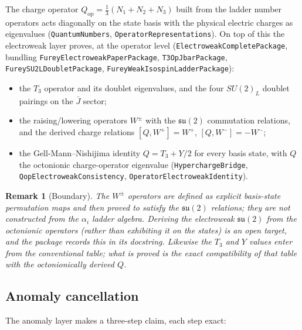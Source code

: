 \documentclass[11pt]{article}
\newcommand{\su}{\mathfrak{su}}
\newcommand{\leanname}[1]{\texttt{#1}}
\newtheorem{remark}{Remark}
\begin{document}
The charge operator $Q_{\mathrm{op}} = \tfrac13(N_1 + N_2 + N_3)$ built
from the ladder number operators acts diagonally on the state basis with
the physical electric charges as eigenvalues
(\leanname{QuantumNumbers}, \leanname{OperatorRepresentations}).  On top
of this the electroweak layer proves, at the operator level
(\leanname{ElectroweakCompletePackage}, bundling
\leanname{FureyElectroweakPaperPackage}, \leanname{T3OpJbarPackage},
\leanname{FureySU2LDoubletPackage},
\leanname{FureyWeakIsospinLadderPackage}):

\begin{itemize}[leftmargin=2em]
\item the $T_3$ operator and its doublet eigenvalues, and the four
  $SU(2)_L$ doublet pairings on the $\bar J$ sector;
\item the raising/lowering operators $W^\pm$ with the $\su(2)$
  commutation relations, and the derived charge relations
  $[Q, W^+] = W^+$, $[Q, W^-] = -W^-$;
\item the Gell-Mann--Nishijima identity $Q = T_3 + Y/2$ for every basis
  state, with $Q$ the octonionic charge-operator eigenvalue
  (\leanname{HyperchargeBridge}, \leanname{QopElectroweakConsistency},
  \leanname{OperatorElectroweakIdentity}).
\end{itemize}

\begin{remark}[Boundary]
The $W^\pm$ operators are \emph{defined} as explicit basis-state
permutation maps and then proved to satisfy the $\su(2)$ relations; they
are not constructed from the $\alpha_i$ ladder algebra.  Deriving the
electroweak $\su(2)$ from the octonionic operators (rather than
exhibiting it on the states) is an open target, and the package records
this in its docstring.  Likewise the $T_3$ and $Y$ \emph{values} enter
from the conventional table; what is proved is the exact compatibility
of that table with the octonionically derived $Q$.
\end{remark}

\subsection{Anomaly cancellation}

The anomaly layer makes a three-step claim, each step exact:
\end{document}
